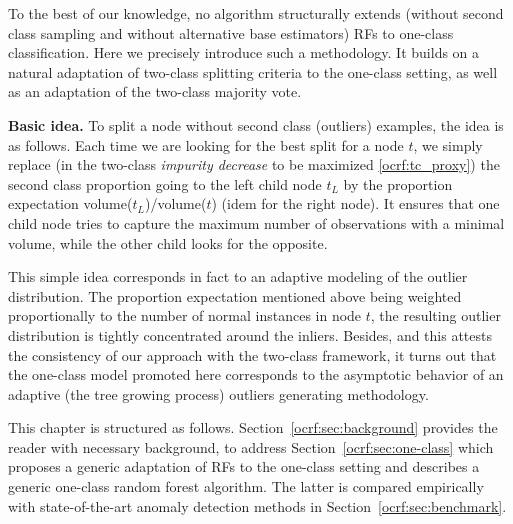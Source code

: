 To the best of our knowledge, no algorithm structurally extends (without second class sampling and without alternative base estimators) RFs to one-class classification. %
Here we precisely %
introduce such a methodology. It builds on a natural adaptation of two-class %
splitting criteria to the one-class setting, as well as an adaptation of the two-class majority vote.

\textbf{Basic idea.} To split a node without second class (outliers) examples, the idea is as follows.
Each time we are looking for the best split for a node $t$, we simply replace (in the two-class \emph{impurity decrease} to be maximized \eqref{ocrf:tc_proxy}) the second class proportion going to the left child node $t_L$ by the proportion expectation volume($t_L$)/volume($t$) (idem for the right node). 
It ensures that one child node tries to capture the maximum number of observations with a minimal volume, while the other child looks for the opposite. %

This simple idea corresponds in fact to an adaptive modeling of the outlier distribution.
The proportion expectation mentioned above being weighted proportionally to the number of normal instances in node $t$, the resulting outlier distribution is tightly concentrated around the inliers. %
%
Besides, and this attests the consistency of our approach with the two-class framework, it turns out that the one-class model promoted here corresponds to the asymptotic behavior of an adaptive (\wrt the tree growing process) outliers generating methodology.

This chapter is structured as follows. Section~\ref{ocrf:sec:background} provides the reader with necessary background, to address Section~\ref{ocrf:sec:one-class} which proposes a generic adaptation of RFs to the one-class setting and describes a generic one-class random forest algorithm. The latter is compared empirically with state-of-the-art anomaly detection methods in Section~\ref{ocrf:sec:benchmark}.
%
